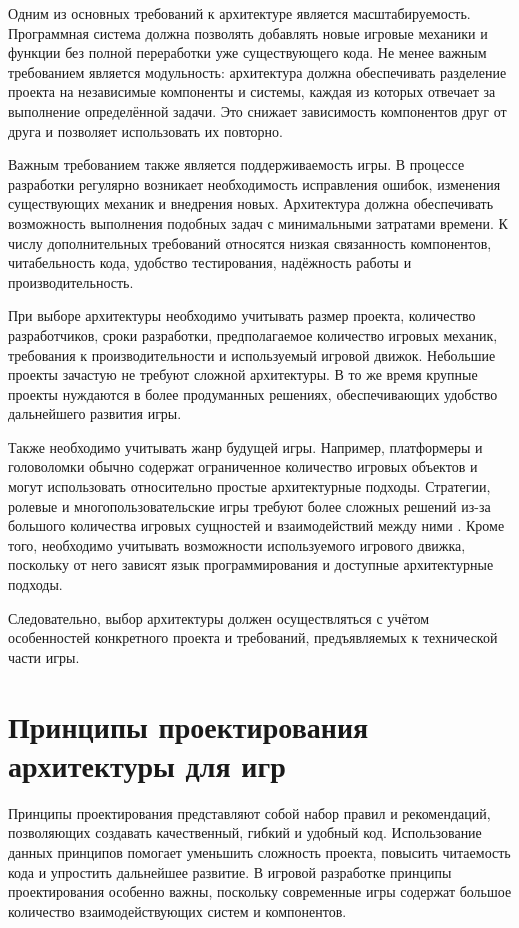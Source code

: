\documentclass[a4paper,12pt]{report}
\begin{document}
Одним из основных требований к архитектуре является масштабируемость. Программная система должна позволять добавлять новые игровые механики и функции без полной переработки уже существующего кода. Не менее важным требованием является модульность: архитектура должна обеспечивать разделение проекта на независимые компоненты и системы, каждая из которых отвечает за выполнение определённой задачи. Это снижает зависимость компонентов друг от друга и позволяет использовать их повторно.

Важным требованием также является поддерживаемость игры. В процессе разработки регулярно возникает необходимость исправления ошибок, изменения существующих механик и внедрения новых. Архитектура должна обеспечивать возможность выполнения подобных задач с минимальными затратами времени. К числу дополнительных требований относятся низкая связанность компонентов, читабельность кода, удобство тестирования, надёжность работы и производительность.

При выборе архитектуры необходимо учитывать размер проекта, количество разработчиков, сроки разработки, предполагаемое количество игровых механик, требования к производительности и используемый игровой движок. Небольшие проекты зачастую не требуют сложной архитектуры. В то же время крупные проекты нуждаются в более продуманных решениях, обеспечивающих удобство дальнейшего развития игры.

Также необходимо учитывать жанр будущей игры. Например, платформеры и головоломки обычно содержат ограниченное количество игровых объектов и могут использовать относительно простые архитектурные подходы. Стратегии, ролевые и многопользовательские игры требуют более сложных решений из-за большого количества игровых сущностей и взаимодействий между ними \cite{digitaldragons}. Кроме того, необходимо учитывать возможности используемого игрового движка, поскольку от него зависят язык программирования и доступные архитектурные подходы.

Следовательно, выбор архитектуры должен осуществляться с учётом особенностей конкретного проекта и требований, предъявляемых к технической части игры.

\section{Принципы проектирования архитектуры для игр}

Принципы проектирования представляют собой набор правил и рекомендаций, позволяющих создавать качественный, гибкий и удобный код. Использование данных принципов помогает уменьшить сложность проекта, повысить читаемость кода и упростить дальнейшее развитие. В игровой разработке принципы проектирования особенно важны, поскольку современные игры содержат большое количество взаимодействующих систем и компонентов.
\end{document}
